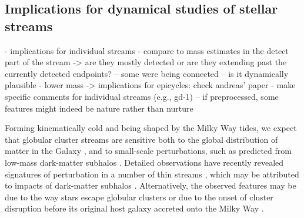 \documentclass[twocolumn]{aastex63}
\begin{document}
%

\subsection{Implications for dynamical studies of stellar streams}
\label{sec:discuss_dynamics}
- implications for individual streams
- compare to mass estimates in the detect part of the stream -> are they mostly detected or are they extending past the currently detected endpoints? -- some were being connected -- is it dynamically plausible
- lower mass -> implications for epicycles: check andreas' paper
- make specific comments for individual streams (e.g., gd-1)
-- if preprocessed, some features might indeed be nature rather than nurture

Forming kinematically cold and being shaped by the Milky Way tides, we expect that globular cluster streams are sensitive both to the global distribution of matter in the Galaxy \citep[e.g.,][]{lux:2013, bonaca:2014, sanders:2014}, and to small-scale perturbations, such as predicted from low-mass dark-matter subhalos \citep[e.g.,][]{ibata:2002, yoon:2011, erkal:2016}.
Detailed observations have recently revealed signatures of perturbation in a number of thin streams \citep[e.g.,][]{pwb, bonaca:2019a, bonaca:2020, li:2020}, which may be attributed to impacts of dark-matter subhalos \citep[e.g.,][]{bonaca:2019b, banik:2019}.
Alternatively, the observed features may be due to the way stars escape globular clusters \citep[e.g.,][]{kuepper:2008, kuepper:2010} or due to the onset of cluster disruption before its original host galaxy accreted onto the Milky Way \citep[e.g.,][]{carlberg:2018, malhan:2020}.
\end{document}
